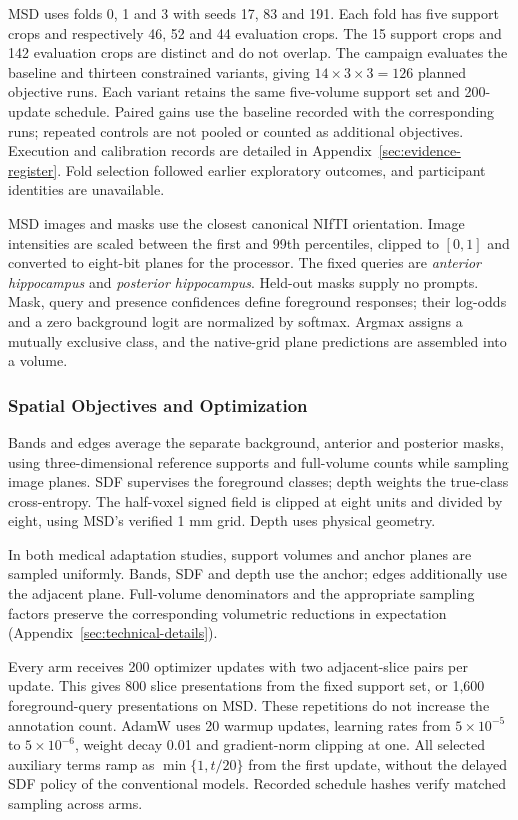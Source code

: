 \documentclass[12pt,a4paper]{article}
\begin{document}
MSD uses folds 0, 1 and 3 with seeds 17, 83 and 191. Each fold has five
support crops and respectively 46, 52 and 44 evaluation crops. The 15
support crops and 142 evaluation crops are distinct and do not overlap.
The campaign evaluates the baseline and thirteen constrained variants,
giving $14\times3\times3=126$ planned objective runs. Each variant
retains the same five-volume support set and 200-update schedule.
Paired gains use the baseline recorded with the corresponding runs;
repeated controls are not pooled or counted as additional objectives.
Execution and calibration records are detailed in
Appendix~\ref{sec:evidence-register}. Fold selection followed earlier
exploratory outcomes, and participant identities are unavailable.

MSD images and masks use the closest canonical NIfTI orientation.
Image intensities are scaled
between the first and 99th percentiles, clipped to $[0,1]$ and converted
to eight-bit planes for the processor. The fixed queries are
\emph{anterior hippocampus} and \emph{posterior hippocampus}.
Held-out masks supply no prompts.
Mask, query and presence confidences define foreground responses;
their log-odds and a zero background logit are normalized by softmax.
Argmax assigns a mutually exclusive class, and the native-grid plane
predictions are assembled into a volume.

\subsubsection{Spatial Objectives and Optimization}

Bands and edges average the separate background, anterior and
posterior masks, using three-dimensional reference supports and
full-volume counts while sampling image planes. SDF supervises the
foreground classes; depth weights the true-class cross-entropy.
The half-voxel signed field is clipped at eight units and divided by
eight, using MSD's verified 1 mm grid. Depth uses physical geometry.

In both medical adaptation studies, support volumes and anchor planes
are sampled uniformly. Bands, SDF
and depth use the anchor; edges additionally use the adjacent plane.
Full-volume denominators and the appropriate sampling factors preserve
the corresponding volumetric reductions in expectation
(Appendix~\ref{sec:technical-details}).

Every arm receives 200 optimizer updates with two adjacent-slice pairs
per update. This gives 800 slice presentations from the fixed support
set, or 1,600 foreground-query presentations on MSD.
These repetitions do not increase the annotation count. AdamW uses
20 warmup updates, learning rates from $5\times10^{-5}$ to
$5\times10^{-6}$, weight decay 0.01 and gradient-norm clipping at one.
All selected auxiliary terms ramp as $\min\{1,t/20\}$ from the first
update, without the delayed SDF policy of the conventional models.
Recorded schedule hashes verify matched sampling across arms.
\end{document}
